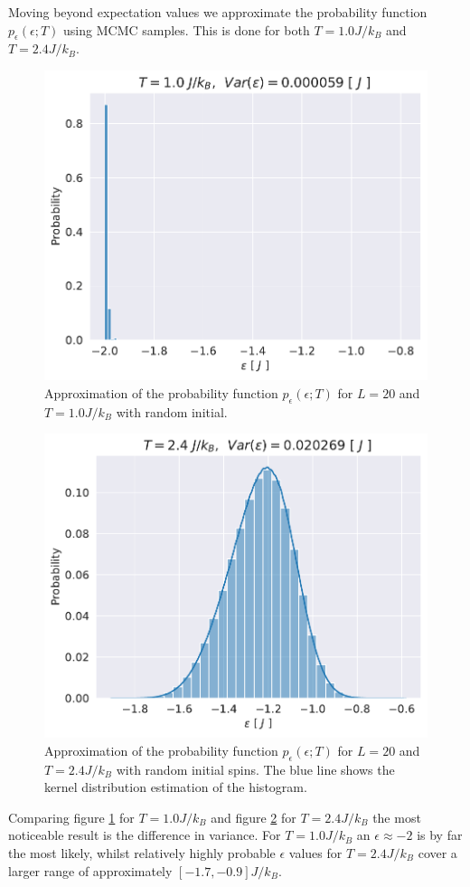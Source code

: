\documentclass[english,notitlepage,reprint,nofootinbib]{revtex4-1}  %
\begin{document}
Moving beyond expectation values we approximate the probability function $p_{\epsilon}(\epsilon ; T)$ using MCMC samples. This is done for both $T=1.0J/k_B$ and $T=2.4J/k_B$.
\begin{figure}[H]
    \centering
    \includegraphics[width=.5\textwidth]{../figures/histogram_T_1_m.pdf}
    \caption{Approximation of the probability function $p_{\epsilon}(\epsilon ; T)$ for $L=20$ and $T=1.0 J/k_B$ with random initial.}
    \label{fig:histogram_T_1_m}
\end{figure}

\begin{figure}[H]
    \centering
    \includegraphics[width=.5\textwidth]{../figures/histogram_T_2_4_m.pdf}
    \caption{Approximation of the probability function $p_{\epsilon}(\epsilon ; T)$ for $L=20$ and $T=2.4 J/k_B$ with random initial spins. The blue line shows the kernel distribution estimation of the histogram.}
    \label{fig:histogram_T_2_4_m}
\end{figure}
Comparing figure \ref{fig:histogram_T_1_m} for $T=1.0 J/k_B$ and figure \ref{fig:histogram_T_2_4_m} for $T=2.4 J/k_B$ the most noticeable result is the difference in variance. For $T=1.0 J/k_B$ an $\epsilon \approx -2$ is by far the most likely, whilst relatively highly probable $\epsilon$ values for $T=2.4 J/k_B$ cover a larger range of approximately $[-1.7,-0.9]J/k_B$.

\onecolumngrid
\newpage
\twocolumngrid
\end{document}
